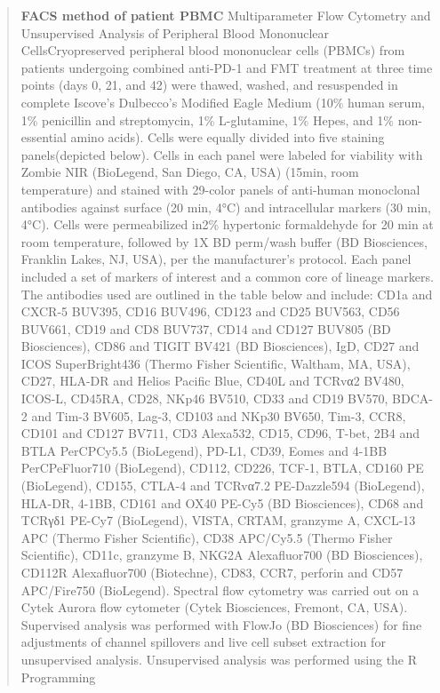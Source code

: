 \documentclass[
]{article}
\begin{document}
\begin{quote}
\textbf{FACS method of patient PBMC} Multiparameter Flow Cytometry and
Unsupervised Analysis of Peripheral Blood Mononuclear CellsCryopreserved
peripheral blood mononuclear cells (PBMCs) from patients undergoing
combined anti-PD-1 and FMT treatment at three time points (days 0, 21,
and 42) were thawed, washed, and resuspended in complete Iscove's
Dulbecco's Modified Eagle Medium (10\% human serum, 1\% penicillin and
streptomycin, 1\% L-glutamine, 1\% Hepes, and 1\% non-essential amino
acids). Cells were equally divided into five staining panels(depicted
below). Cells in each panel were labeled for viability with Zombie NIR
(BioLegend, San Diego, CA, USA) (15min, room temperature) and stained
with 29-color panels of anti-human monoclonal antibodies against surface
(20 min, 4°C) and intracellular markers (30 min, 4°C). Cells were
permeabilized in2\% hypertonic formaldehyde for 20 min at room
temperature, followed by 1X BD perm/wash buffer (BD Biosciences,
Franklin Lakes, NJ, USA), per the manufacturer's protocol. Each panel
included a set of markers of interest and a common core of lineage
markers. The antibodies used are outlined in the table below and
include: CD1a and CXCR-5 BUV395, CD16 BUV496, CD123 and CD25 BUV563,
CD56 BUV661, CD19 and CD8 BUV737, CD14 and CD127 BUV805 (BD
Biosciences), CD86 and TIGIT BV421 (BD Biosciences), IgD, CD27 and ICOS
SuperBright436 (Thermo Fisher Scientific, Waltham, MA, USA), CD27,
HLA-DR and Helios Pacific Blue, CD40L and TCRvα2 BV480, ICOS-L, CD45RA,
CD28, NKp46 BV510, CD33 and CD19 BV570, BDCA-2 and Tim-3 BV605, Lag-3,
CD103 and NKp30 BV650, Tim-3, CCR8, CD101 and CD127 BV711, CD3 Alexa532,
CD15, CD96, T-bet, 2B4 and BTLA PerCPCy5.5 (BioLegend), PD-L1, CD39,
Eomes and 4-1BB PerCPeFluor710 (BioLegend), CD112, CD226, TCF-1, BTLA,
CD160 PE (BioLegend), CD155, CTLA-4 and TCRvα7.2 PE-Dazzle594
(BioLegend), HLA-DR, 4-1BB, CD161 and OX40 PE-Cy5 (BD Biosciences), CD68
and TCRγδ1 PE-Cy7 (BioLegend), VISTA, CRTAM, granzyme A, CXCL-13 APC
(Thermo Fisher Scientific), CD38 APC/Cy5.5 (Thermo Fisher Scientific),
CD11c, granzyme B, NKG2A Alexafluor700 (BD Biosciences), CD112R
Alexafluor700 (Biotechne), CD83, CCR7, perforin and CD57 APC/Fire750
(BioLegend). Spectral flow cytometry was carried out on a Cytek Aurora
flow cytometer (Cytek Biosciences, Fremont, CA, USA). Supervised
analysis was performed with FlowJo (BD Biosciences) for fine adjustments
of channel spillovers and live cell subset extraction for unsupervised
analysis. Unsupervised analysis was performed using the R Programming

\end{quote}
\end{document}

